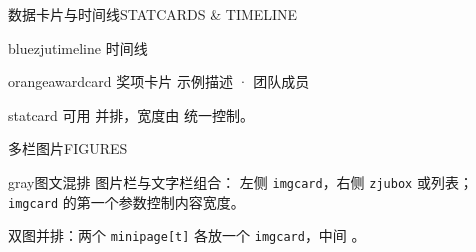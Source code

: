 \documentclass[10pt,aspectratio=169]{beamer}
\begin{document}
\begin{frame}{数据卡片与时间线}{STATCARDS \& TIMELINE}
  \zjustatwidth=4.55cm
  \begin{center}
    \hfill
    \hfill
  \end{center}
  \vspace{0.4mm}
  \begin{minipage}[t]{0.475\textwidth}
    \vspace{0pt}%
    \begin{zjubox}{blue}{zjutimeline 时间线}
      \begin{zjutimeline}
      \end{zjutimeline}
    \end{zjubox}
  \end{minipage}\hfill
  \begin{minipage}[t]{0.475\textwidth}
    \vspace{0pt}%
    \begin{zjubox}{orange}{awardcard 奖项卡片}
      \zjuawardwidth=6.1cm
      {示例描述 · 团队成员}
    \end{zjubox}
  \end{minipage}
  \begin{takeaway}
    statcard 可用 \string\hfill 并排，宽度由 \string\zjustatwidth 统一控制。
  \end{takeaway}
\end{frame}

\begin{frame}{多栏图片}{FIGURES}
  \begin{minipage}[t]{0.475\textwidth}
    \vspace{0pt}%
    \centering
  \end{minipage}\hfill
  \begin{minipage}[t]{0.475\textwidth}
    \vspace{0pt}%
    \centering
  \end{minipage}
  \vspace{1.2mm}
  \begin{zjubox}{gray}{图文混排}
    {\small 图片栏与文字栏组合：
    左侧 \texttt{imgcard}，右侧 \texttt{zjubox} 或列表；
    \texttt{imgcard} 的第一个参数控制内容宽度。}
  \end{zjubox}
  \begin{takeaway}
    双图并排：两个 \texttt{minipage[t]} 各放一个 \texttt{imgcard}，中间 \string\hfill。
  \end{takeaway}
\end{frame}
\end{document}
